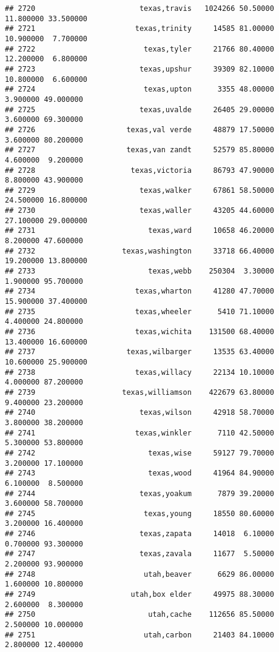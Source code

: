 \documentclass[
]{article}
\begin{document}
\begin{verbatim}
## 2720                        texas,travis   1024266 50.50000 11.800000 33.500000
## 2721                       texas,trinity     14585 81.00000 10.900000  7.700000
## 2722                         texas,tyler     21766 80.40000 12.200000  6.800000
## 2723                        texas,upshur     39309 82.10000 10.800000  6.600000
## 2724                         texas,upton      3355 48.00000  3.900000 49.000000
## 2725                        texas,uvalde     26405 29.00000  3.600000 69.300000
## 2726                     texas,val verde     48879 17.50000  3.600000 80.200000
## 2727                     texas,van zandt     52579 85.80000  4.600000  9.200000
## 2728                      texas,victoria     86793 47.90000  8.800000 43.900000
## 2729                        texas,walker     67861 58.50000 24.500000 16.800000
## 2730                        texas,waller     43205 44.60000 27.100000 29.000000
## 2731                          texas,ward     10658 46.20000  8.200000 47.600000
## 2732                    texas,washington     33718 66.40000 19.200000 13.800000
## 2733                          texas,webb    250304  3.30000  1.900000 95.700000
## 2734                       texas,wharton     41280 47.70000 15.900000 37.400000
## 2735                       texas,wheeler      5410 71.10000  4.400000 24.800000
## 2736                       texas,wichita    131500 68.40000 13.400000 16.600000
## 2737                     texas,wilbarger     13535 63.40000 10.600000 25.900000
## 2738                       texas,willacy     22134 10.10000  4.000000 87.200000
## 2739                    texas,williamson    422679 63.80000  9.400000 23.200000
## 2740                        texas,wilson     42918 58.70000  3.800000 38.200000
## 2741                       texas,winkler      7110 42.50000  5.300000 53.800000
## 2742                          texas,wise     59127 79.70000  3.200000 17.100000
## 2743                          texas,wood     41964 84.90000  6.100000  8.500000
## 2744                        texas,yoakum      7879 39.20000  3.600000 58.700000
## 2745                         texas,young     18550 80.60000  3.200000 16.400000
## 2746                        texas,zapata     14018  6.10000  0.700000 93.300000
## 2747                        texas,zavala     11677  5.50000  2.200000 93.900000
## 2748                         utah,beaver      6629 86.00000  1.600000 10.800000
## 2749                      utah,box elder     49975 88.30000  2.600000  8.300000
## 2750                          utah,cache    112656 85.50000  2.500000 10.000000
## 2751                         utah,carbon     21403 84.10000  2.800000 12.400000

\end{verbatim}
\end{document}
